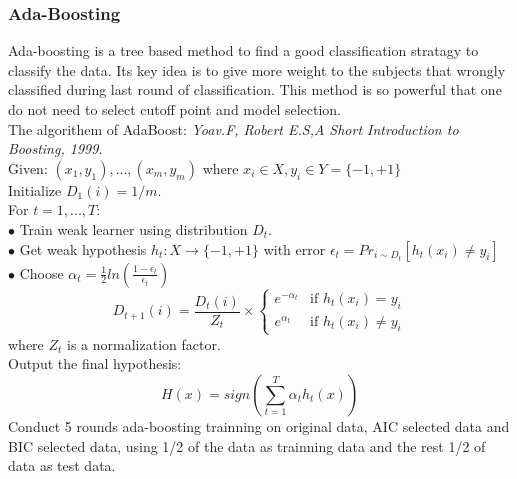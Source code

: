 \documentclass[11pt]{article}\usepackage[]{graphicx}\usepackage[]{color}
\begin{document}
\subsubsection{Ada-Boosting}

Ada-boosting is a tree based method to find a good classification stratagy to classify the data. Its key idea is to give more weight to the subjects that wrongly classified during last round of classification. This method is so powerful that one do not need to select cutoff point and model selection.\\
The algorithem of AdaBoost: \textit{Yoav.F, Robert E.S,A Short Introduction to Boosting, 1999.}\\
Given: $(x_1,y_1),...,(x_m,y_m)$ where $x_i \in X, y_i \in Y=\{-1,+1\}$\\
Initialize $D_1(i)=1/m$.\\
For $t=1,...,T$:\\
$\bullet$ Train weak learner using distribution $D_t$.\\
$\bullet$ Get weak hypothesis $h_t : X \rightarrow \{-1,+1\}$ with error $\epsilon_t=Pr_{i\sim D_t}\left[ h_t(x_i)\ne y_i \right]$\\
$\bullet$ Choose $\alpha_t=\frac{1}{2}ln\left(\frac{1-\epsilon_t}{\epsilon_t}\right)$\\
\[
D_{t+1}(i)=\frac{D_t(i)}{Z_t}\times
\left\{\begin{matrix}
e^{-\alpha_t} & \mbox{if $h_t(x_i)=y_i$}\\
e^{\alpha_t} & \mbox{if $h_t(x_i)\ne y_i$}
\end{matrix}
\right.
\]
where $Z_t$ is a normalization factor.\\
Output the final hypothesis:\\
$$H(x)=sign\left(\sum_{t=1}^{T}\alpha_t h_t(x)\right)$$
Conduct 5 rounds ada-boosting trainning on original data, AIC selected data and BIC selected data, using 1/2 of the data as trainning data and the rest 1/2 of data as test data.
\begin{table}[ht]
\centering
{}
\end{table}
\end{document}
